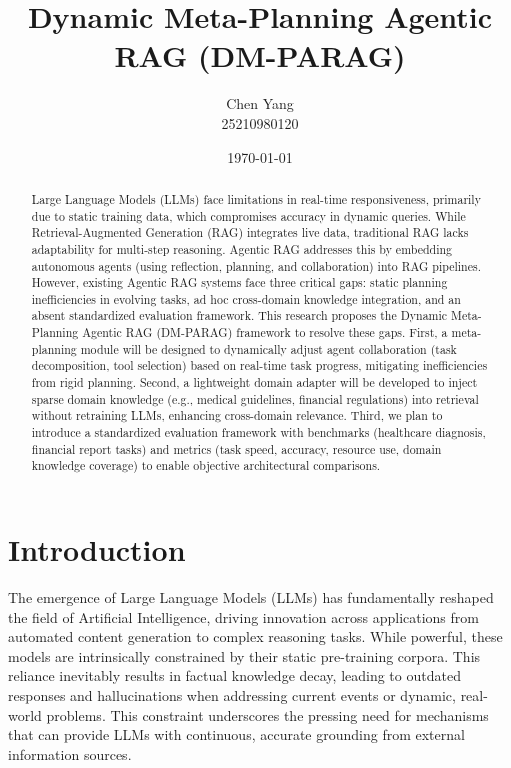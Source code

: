 \documentclass[12pt,en]{elegantpaper}
\title{Dynamic Meta-Planning Agentic RAG (DM-PARAG)}
\author{Chen Yang \\ 25210980120}
\date{\today}
\begin{document}
\maketitle

\begin{abstract}
Large Language Models (LLMs) face limitations in real-time responsiveness, primarily due to static training data, which compromises accuracy in dynamic queries. While Retrieval-Augmented Generation (RAG) integrates live data, traditional RAG lacks adaptability for multi-step reasoning. Agentic RAG addresses this by embedding autonomous agents (using reflection, planning, and collaboration) into RAG pipelines. However, existing Agentic RAG systems face three critical gaps: static planning inefficiencies in evolving tasks, ad hoc cross-domain knowledge integration, and an absent standardized evaluation framework. This research proposes the Dynamic Meta-Planning Agentic RAG (DM-PARAG) framework to resolve these gaps. First, a meta-planning module will be designed to dynamically adjust agent collaboration (task decomposition, tool selection) based on real-time task progress, mitigating inefficiencies from rigid planning. Second, a lightweight domain adapter will be developed to inject sparse domain knowledge (e.g., medical guidelines, financial regulations) into retrieval without retraining LLMs, enhancing cross-domain relevance. Third, we plan to introduce a standardized evaluation framework with benchmarks (healthcare diagnosis, financial report tasks) and metrics (task speed, accuracy, resource use, domain knowledge coverage) to enable objective architectural comparisons.
\end{abstract}

\section{Introduction}

The emergence of Large Language Models (LLMs) has fundamentally reshaped the field of Artificial Intelligence, driving innovation across applications from automated content generation to complex reasoning tasks. While powerful, these models are intrinsically constrained by their static pre-training corpora. This reliance inevitably results in factual knowledge decay, leading to outdated responses and hallucinations when addressing current events or dynamic, real-world problems. This constraint underscores the pressing need for mechanisms that can provide LLMs with continuous, accurate grounding from external information sources.
\end{document}
